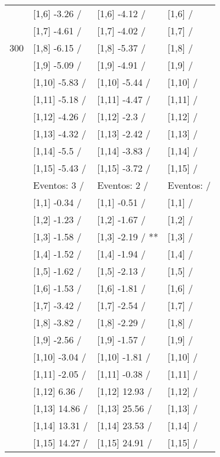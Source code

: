 \begin{table}
\begin{tabular}[t]{llll}
 & {}[1,6] -3.26  / & {}[1,6] -4.12  / & {}[1,6]  /\\
 & {}[1,7] -4.61  / & {}[1,7] -4.02  / & {}[1,7]  /\\
300 & {}[1,8] -6.15  / & {}[1,8] -5.37  / & {}[1,8]  /\\
\addlinespace
 & {}[1,9] -5.09  / & {}[1,9] -4.91  / & {}[1,9]  /\\
 & {}[1,10] -5.83  / & {}[1,10] -5.44  / & {}[1,10]  /\\
 & {}[1,11] -5.18  / & {}[1,11] -4.47  / & {}[1,11]  /\\
 & {}[1,12] -4.26  / & {}[1,12] -2.3  / & {}[1,12]  /\\
 & {}[1,13] -4.32  / & {}[1,13] -2.42  / & {}[1,13]  /\\
\addlinespace
 & {}[1,14] -5.5  / & {}[1,14] -3.83  / & {}[1,14]  /\\
 & {}[1,15] -5.43  / & {}[1,15] -3.72  / & {}[1,15]  /\\
 & Eventos:  3 / & Eventos:  2 / & Eventos:   /\\
 & {}[1,1] -0.34  / & {}[1,1] -0.51  / & {}[1,1]  /\\
 & {}[1,2] -1.23  / & {}[1,2] -1.67  / & {}[1,2]  /\\
\addlinespace
 & {}[1,3] -1.58  / & {}[1,3] -2.19  / ** & {}[1,3]  /\\
 & {}[1,4] -1.52  / & {}[1,4] -1.94  / & {}[1,4]  /\\
 & {}[1,5] -1.62  / & {}[1,5] -2.13  / & {}[1,5]  /\\
 & {}[1,6] -1.53  / & {}[1,6] -1.81  / & {}[1,6]  /\\
 & {}[1,7] -3.42  / & {}[1,7] -2.54  / & {}[1,7]  /\\
\addlinespace
500 & {}[1,8] -3.82  / & {}[1,8] -2.29  / & {}[1,8]  /\\
 & {}[1,9] -2.56  / & {}[1,9] -1.57  / & {}[1,9]  /\\
 & {}[1,10] -3.04  / & {}[1,10] -1.81  / & {}[1,10]  /\\
 & {}[1,11] -2.05  / & {}[1,11] -0.38  / & {}[1,11]  /\\
 & {}[1,12] 6.36  / & {}[1,12] 12.93  / & {}[1,12]  /\\
\addlinespace
 & {}[1,13] 14.86  / & {}[1,13] 25.56  / & {}[1,13]  /\\
 & {}[1,14] 13.31  / & {}[1,14] 23.53  / & {}[1,14]  /\\
 & {}[1,15] 14.27  / & {}[1,15] 24.91  / & {}[1,15]  /\\
\bottomrule
\end{tabular}
\end{table}
